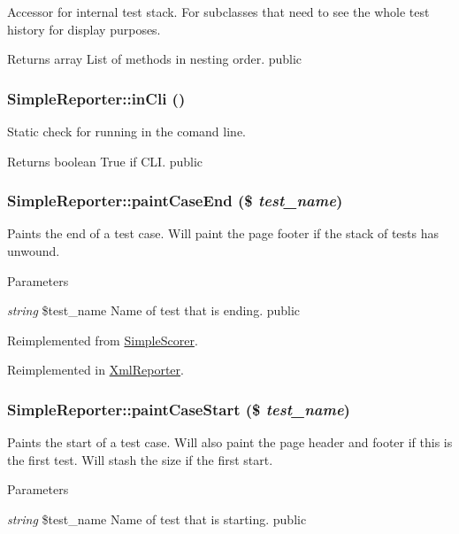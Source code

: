 \label{class_simple_reporter_aa4bce8bfcd41c7ec33a22866f2b170a9}
Accessor for internal test stack. For subclasses that need to see the whole test history for display purposes. \begin{DoxyReturn}{Returns}
array List of methods in nesting order.  public 
\end{DoxyReturn}
\hypertarget{class_simple_reporter_ab6887c05e232ca0d00104119ede58d85}{
\subsubsection[{inCli}]{\setlength{\rightskip}{0pt plus 5cm}SimpleReporter::inCli ()}}
\label{class_simple_reporter_ab6887c05e232ca0d00104119ede58d85}
Static check for running in the comand line. \begin{DoxyReturn}{Returns}
boolean True if CLI.  public 
\end{DoxyReturn}
\hypertarget{class_simple_reporter_a8e6c0fb28e29920fe42eef652f822753}{
\subsubsection[{paintCaseEnd}]{\setlength{\rightskip}{0pt plus 5cm}SimpleReporter::paintCaseEnd (\$ {\em test\_\-name})}}
\label{class_simple_reporter_a8e6c0fb28e29920fe42eef652f822753}
Paints the end of a test case. Will paint the page footer if the stack of tests has unwound. 
\begin{DoxyParams}{Parameters}
\item[{\em string}]\$test\_\-name Name of test that is ending.  public \end{DoxyParams}


Reimplemented from \hyperlink{class_simple_scorer_af61cf47c364d7fbe592714776e588e2a}{SimpleScorer}.

Reimplemented in \hyperlink{class_xml_reporter_a1d5e2bab9c6f61d49e65ec55e9a04015}{XmlReporter}.\hypertarget{class_simple_reporter_a987d5bbfa2cc927da394f6bc6053c23e}{
\subsubsection[{paintCaseStart}]{\setlength{\rightskip}{0pt plus 5cm}SimpleReporter::paintCaseStart (\$ {\em test\_\-name})}}
\label{class_simple_reporter_a987d5bbfa2cc927da394f6bc6053c23e}
Paints the start of a test case. Will also paint the page header and footer if this is the first test. Will stash the size if the first start. 
\begin{DoxyParams}{Parameters}
\item[{\em string}]\$test\_\-name Name of test that is starting.  public \end{DoxyParams}


